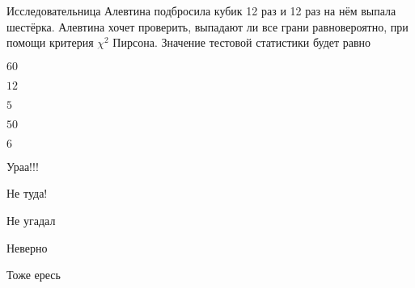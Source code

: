 
\begin{question}
Исследовательница Алевтина подбросила кубик 12 раз и 12 раз на нём
выпала шестёрка. Алевтина хочет проверить, выпадают ли все грани
равновероятно, при помощи критерия \(\chi^2\) Пирсона. Значение тестовой
статистики будет равно
\begin{answerlist}
  \item \(60\)
  \item \(12\)
  \item \(5\)
  \item \(50\)
  \item \(6\)
\end{answerlist}
\end{question}

\begin{solution}
\begin{answerlist}
  \item Ураа!!!
  \item Не туда!
  \item Не угадал
  \item Неверно
  \item Тоже ересь
\end{answerlist}
\end{solution}

